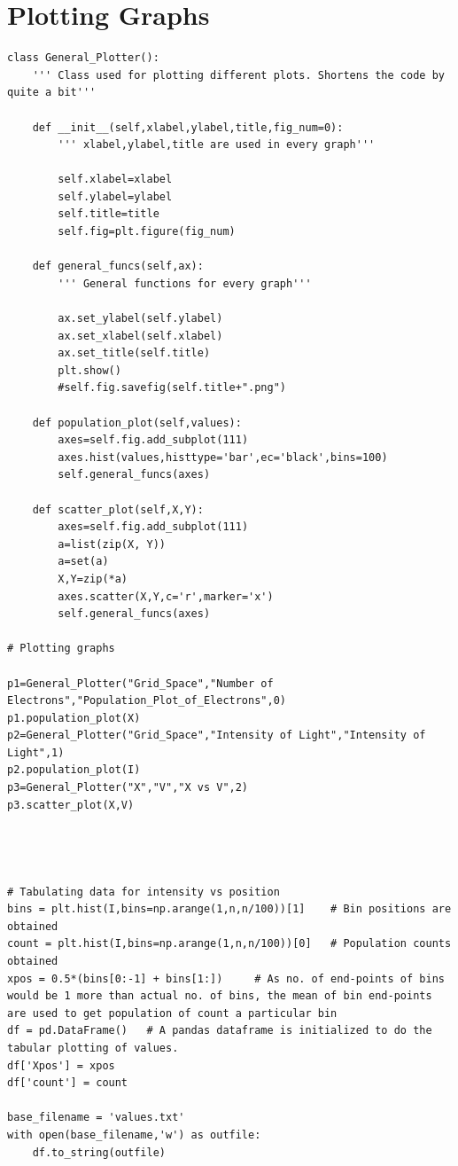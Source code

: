 \documentclass[11pt, a4paper]{article}
\begin{document}
\section{Plotting Graphs}
\begin{lstlisting}
class General_Plotter():
    ''' Class used for plotting different plots. Shortens the code by quite a bit'''
    
    def __init__(self,xlabel,ylabel,title,fig_num=0):
        ''' xlabel,ylabel,title are used in every graph''' 

        self.xlabel=xlabel
        self.ylabel=ylabel
        self.title=title
        self.fig=plt.figure(fig_num)
    
    def general_funcs(self,ax):
        ''' General functions for every graph'''
        
        ax.set_ylabel(self.ylabel)
        ax.set_xlabel(self.xlabel)
        ax.set_title(self.title)
        plt.show()
        #self.fig.savefig(self.title+".png")

    def population_plot(self,values):
        axes=self.fig.add_subplot(111)
        axes.hist(values,histtype='bar',ec='black',bins=100)
        self.general_funcs(axes)

    def scatter_plot(self,X,Y):
        axes=self.fig.add_subplot(111)
        a=list(zip(X, Y))
        a=set(a)
        X,Y=zip(*a)
        axes.scatter(X,Y,c='r',marker='x')
        self.general_funcs(axes)

# Plotting graphs

p1=General_Plotter("Grid_Space","Number of Electrons","Population_Plot_of_Electrons",0)
p1.population_plot(X)
p2=General_Plotter("Grid_Space","Intensity of Light","Intensity of Light",1)
p2.population_plot(I)
p3=General_Plotter("X","V","X vs V",2)
p3.scatter_plot(X,V)




# Tabulating data for intensity vs position
bins = plt.hist(I,bins=np.arange(1,n,n/100))[1]    # Bin positions are obtained
count = plt.hist(I,bins=np.arange(1,n,n/100))[0]   # Population counts obtained
xpos = 0.5*(bins[0:-1] + bins[1:])     # As no. of end-points of bins would be 1 more than actual no. of bins, the mean of bin end-points are used to get population of count a particular bin
df = pd.DataFrame()   # A pandas dataframe is initialized to do the tabular plotting of values.
df['Xpos'] = xpos
df['count'] = count

base_filename = 'values.txt'
with open(base_filename,'w') as outfile:
    df.to_string(outfile)
\end{lstlisting}
\end{document}
